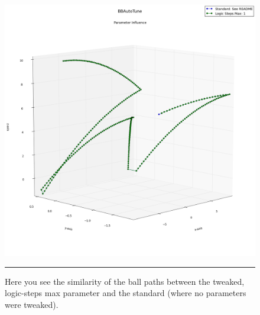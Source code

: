 \begin{figure}[htbp]
\centering
\includegraphics[scale=0.35]{../Figures/Chapter4/logic_steps_ball_plot.png}
\rule{35em}{0.5pt}
\caption[Physics Engine Racquetball Path Similarity]{Here you see the similarity of the ball paths between the tweaked, logic-steps max parameter and the standard (where no parameters were tweaked).}
\label{fig:logicstepsplot}
\end{figure}

